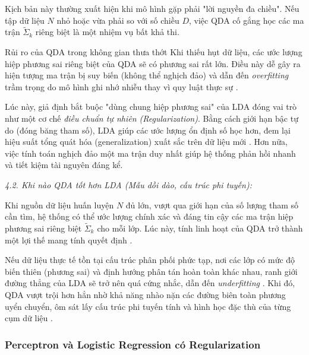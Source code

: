 Kịch bản này thường xuất hiện khi mô hình gặp phải "lời nguyền đa chiều". Nếu tập dữ liệu $N$ nhỏ hoặc vừa phải so với số chiều $D$, việc QDA cố gắng học các ma trận $\tilde{\Sigma}_k$ riêng biệt là một nhiệm vụ bất khả thi.

\begin{warningbox}{Rủi ro của QDA trong không gian thưa thớt}
Khi thiếu hụt dữ liệu, các ước lượng hiệp phương sai riêng biệt của QDA sẽ có phương sai rất lớn. Điều này dễ gây ra hiện tượng ma trận bị suy biến (không thể nghịch đảo) và dẫn đến \textit{overfitting} trầm trọng do mô hình ghi nhớ nhiễu thay vì quy luật thực sự \cite{tezekbayev2019linear}.
\end{warningbox}

Lúc này, giả định bắt buộc "dùng chung hiệp phương sai" của LDA đóng vai trò như một cơ chế \textit{điều chuẩn tự nhiên (Regularization)}. Bằng cách giới hạn bậc tự do (đóng băng tham số), LDA giúp các ước lượng ổn định số học hơn, đem lại hiệu suất tổng quát hóa (generalization) xuất sắc trên dữ liệu mới \cite{welling2005fisher, tezekbayev2019linear}. Hơn nữa, việc tính toán nghịch đảo một ma trận duy nhất giúp hệ thống phản hồi nhanh và tiết kiệm tài nguyên đáng kể.

\vspace{0.5em}

\noindent\textcolor{infocolor}{\textit{4.2. Khi nào QDA tốt hơn LDA (Mẫu dồi dào, cấu trúc phi tuyến):}}

Khi nguồn dữ liệu huấn luyện $N$ đủ lớn, vượt qua giới hạn của số lượng tham số cần tìm, hệ thống có thể ước lượng chính xác và đáng tin cậy các ma trận hiệp phương sai riêng biệt $\tilde{\Sigma}_k$ cho mỗi lớp. Lúc này, tính linh hoạt của QDA trở thành một lợi thế mang tính quyết định \cite{welling2005fisher}.

Nếu dữ liệu thực tế tồn tại cấu trúc phân phối phức tạp, nơi các lớp có mức độ biến thiên (phương sai) và định hướng phân tán hoàn toàn khác nhau, ranh giới đường thẳng của LDA sẽ trở nên quá cứng nhắc, dẫn đến \textit{underfitting} \cite{tezekbayev2019linear}. Khi đó, QDA vượt trội hơn hẳn nhờ khả năng nhào nặn các đường biên toàn phương uyển chuyển, ôm sát lấy cấu trúc phi tuyến tính và hình học đặc thù của từng cụm dữ liệu \cite{welling2005fisher, tezekbayev2019linear}.

\subsubsection{Perceptron và Logistic Regression có Regularization}

